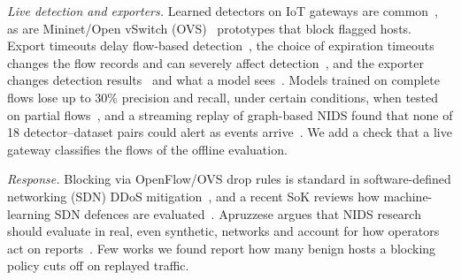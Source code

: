 \emph{Live detection and exporters.} Learned detectors on IoT gateways are common~\cite{realguard2022}, as are Mininet/Open vSwitch (OVS)~\cite{lantz2010mininet,pfaff2015ovs} prototypes that block flagged hosts. Export timeouts delay flow-based detection~\cite{hofstede2013realtime}, the choice of expiration timeouts changes the flow records and can severely affect detection~\cite{velan2020impact}, and the exporter changes detection results~\cite{pinto2025flowexporter,pinto2025hera} and what a model sees~\cite{vitorino2025revisiting}. Models trained on complete flows lose up to 30\% precision and recall, under certain conditions, when tested on partial flows~\cite{pekar2025early}, and a streaming replay of graph-based NIDS found that none of 18 detector--dataset pairs could alert as events arrive~\cite{zhao2026gidseval}. We add a check that a live gateway classifies the flows of the offline evaluation.

\emph{Response.} Blocking via OpenFlow/OVS drop rules is standard in software-defined networking (SDN) DDoS mitigation~\cite{bawany2017ddos,yan2016sdn}, and a recent SoK reviews how machine-learning SDN defences are evaluated~\cite{orsdemir2026sok}. Apruzzese argues that NIDS research should evaluate in real, even synthetic, networks and account for how operators act on reports~\cite{apruzzese2026reshaping}. Few works we found report how many benign hosts a blocking policy cuts off on replayed traffic.
